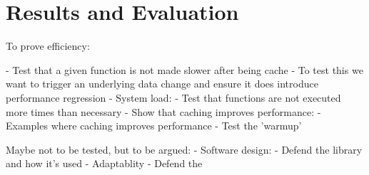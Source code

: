 \chapter{Results and Evaluation}
\label{chapter:results_and_evaluation}

To prove efficiency:

- Test that a given function is not made slower after being cache
  - To test this we want to trigger an underlying data change and ensure it does
    introduce performance regression
- System load:
  - Test that functions are not executed more times than necessary
- Show that caching improves performance:
  - Examples where caching improves performance
- Test the 'warmup'

Maybe not to be tested, but to be argued:
- Software design:
  - Defend the library and how it's used
- Adaptablity
  - Defend the


